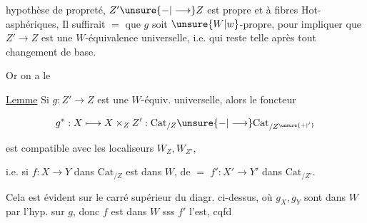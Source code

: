 
hypothèse de propreté, $Z'\unsure{\mathord{-}|\longrightarrow}Z$ est propre et à fibres Hot-asphériques,  Il suffirait $=$ que $g$ soit $\unsure{W|w}$-propre, pour impliquer que $Z'\longrightarrow Z$ est une $W$-équivalence universelle, i.e. qui reste telle après tout changement de base.

Or on a le

\uline{Lemme} Si $g:Z'\longrightarrow Z$ est une $W$-équiv. universelle, alors le foncteur

\[
 g^*:X\longmapsto X\times_Z Z':\mathrm{Cat}_{/Z}\unsure{\mathord{-}|\longrightarrow}\mathrm{Cat}_{/Z^{\unsure{+|'}}}
\]

est compatible avec les localiseurs $W_Z,W_{Z'}$,


i.e. si $f:X\longrightarrow Y$ dans $\mathrm{Cat}_{/Z}$ est dans $W$, de $=$ $f':X'\longrightarrow Y'$ dans $\mathrm{Cat}_{/Z'}$.

Cela est évident sur le carré supérieur du diagr. ci-dessus, où $g_X,g_Y$ sont dans $W$ par l'hyp. sur $g$, donc $f$ est dans $W$ sss $f'$ l'est, cqfd


